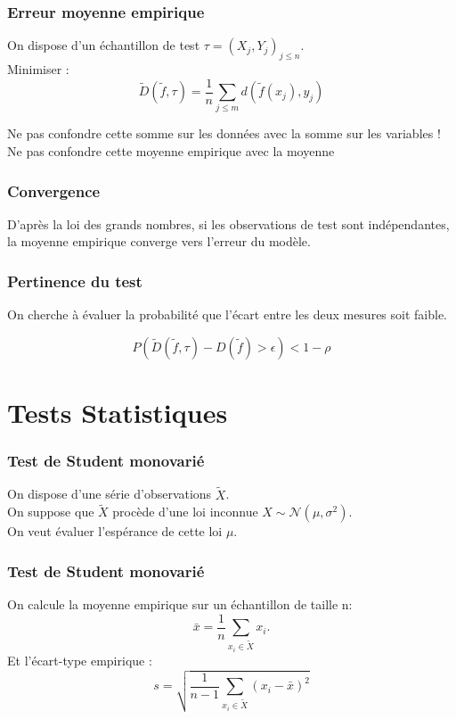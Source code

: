 \documentclass[11pt]{beamer}
\newenvironment{slide}[1]{%
\begin{frame}[environment=slide]
\frametitle{#1}
}{%
\end{frame}
}
\begin{document}
\begin{slide}{Erreur moyenne empirique}

On dispose d'un échantillon de test $\tau = (X_j,Y_j)_{j\leq n}$.\\

Minimiser :
$$\tilde{D}(\tilde{f},\tau) = \frac{1}{n}\sum_{j \leq m} d(\tilde{f}(x_j),y_j)$$

\pause

Ne pas confondre cette somme sur les données avec la somme sur les variables !\\
Ne pas confondre cette moyenne empirique avec la moyenne 
\end{slide}

\begin{slide}{Convergence}

D'après la loi des grands nombres, si les observations de test sont indépendantes, la moyenne empirique converge vers l'erreur du modèle.
\end{slide}

\begin{slide}{Pertinence du test}
On cherche à évaluer la probabilité que l'écart entre les deux mesures soit faible.

$$P\left(\tilde{D}(\tilde{f},\tau)-D(\tilde{f}) > \epsilon \right) < 1 - \rho$$

\end{slide}


\section{Tests Statistiques}

\begin{slide}{Test de Student monovarié}
On dispose d'une série d'observations $\tilde{X}$.\\
\pause
\vspace{0.2cm}On suppose que $\tilde{X}$ procède d'une loi inconnue $X \sim \mathcal{N}(\mu,\sigma^2)$.\\
\pause
\vspace{0.2cm}On veut évaluer l'espérance de cette loi $\mu$. 

\end{slide}

\begin{slide}{Test de Student monovarié}
On calcule la moyenne empirique sur un échantillon de taille n:
$$\bar{x} = \frac{1}{n}\sum_{x_i \in \tilde{X}} x_i.$$
\pause
Et l'écart-type empirique :
$$s = \sqrt{\frac{1}{n-1}\sum_{x_i \in \tilde{X}}(x_i-\bar{x})^2}$$

\end{slide}
\end{document}
